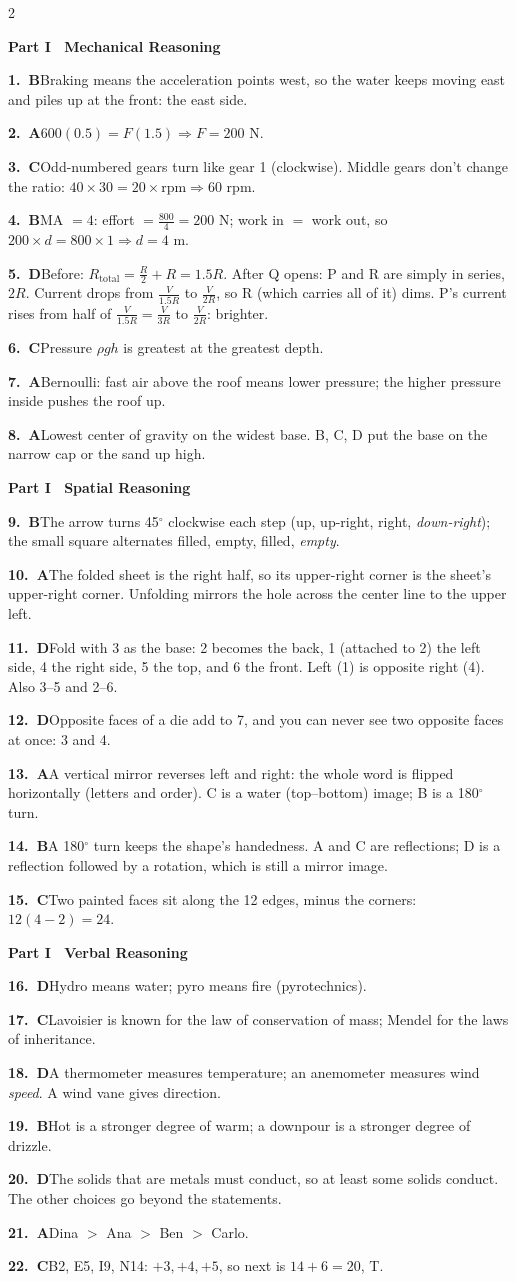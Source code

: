 \documentclass[10pt]{article}
\newcommand{\ans}[3]{\par\noindent\textbf{#1.~\textcolor{dblue}{#2}}\enspace #3}
\begin{document}
\begin{multicols}{2}
\footnotesize
\setlength{\parskip}{1.6pt}

{\sffamily\bfseries\color{dblue}Part I \textbullet\ Mechanical Reasoning}
\ans{1}{B}{Braking means the acceleration points west, so the water keeps moving east and piles up at the front: the east side.}
\ans{2}{A}{$600(0.5)=F(1.5)\Rightarrow F=200$ N.}
\ans{3}{C}{Odd-numbered gears turn like gear 1 (clockwise). Middle gears don't change the ratio: $40\times30=20\times\text{rpm}\Rightarrow60$ rpm.}
\ans{4}{B}{MA $=4$: effort $=\frac{800}4=200$ N; work in $=$ work out, so $200\times d=800\times1\Rightarrow d=4$ m.}
\ans{5}{D}{Before: $R_\text{total}=\frac R2+R=1.5R$. After Q opens: P and R are simply in series, $2R$. Current drops from $\frac V{1.5R}$ to $\frac V{2R}$, so R (which carries all of it) dims. P's current rises from half of $\frac V{1.5R}=\frac V{3R}$ to $\frac V{2R}$: brighter.}
\ans{6}{C}{Pressure $\rho gh$ is greatest at the greatest depth.}
\ans{7}{A}{Bernoulli: fast air above the roof means lower pressure; the higher pressure inside pushes the roof up.}
\ans{8}{A}{Lowest center of gravity on the widest base. B, C, D put the base on the narrow cap or the sand up high.}

{\sffamily\bfseries\color{dblue}Part I \textbullet\ Spatial Reasoning}
\ans{9}{B}{The arrow turns 45$^\circ$ clockwise each step (up, up-right, right, \emph{down-right}); the small square alternates filled, empty, filled, \emph{empty}.}
\ans{10}{A}{The folded sheet is the right half, so its upper-right corner is the sheet's upper-right corner. Unfolding mirrors the hole across the center line to the upper left.}
\ans{11}{D}{Fold with 3 as the base: 2 becomes the back, 1 (attached to 2) the left side, 4 the right side, 5 the top, and 6 the front. Left (1) is opposite right (4). Also 3--5 and 2--6.}
\ans{12}{D}{Opposite faces of a die add to 7, and you can never see two opposite faces at once: 3 and 4.}
\ans{13}{A}{A vertical mirror reverses left and right: the whole word is flipped horizontally (letters and order). C is a water (top--bottom) image; B is a 180$^\circ$ turn.}
\ans{14}{B}{A 180$^\circ$ turn keeps the shape's handedness. A and C are reflections; D is a reflection followed by a rotation, which is still a mirror image.}
\ans{15}{C}{Two painted faces sit along the 12 edges, minus the corners: $12(4-2)=24$.}

{\sffamily\bfseries\color{dblue}Part I \textbullet\ Verbal Reasoning}
\ans{16}{D}{Hydro means water; pyro means fire (pyrotechnics).}
\ans{17}{C}{Lavoisier is known for the law of conservation of mass; Mendel for the laws of inheritance.}
\ans{18}{D}{A thermometer measures temperature; an anemometer measures wind \emph{speed}. A wind vane gives direction.}
\ans{19}{B}{Hot is a stronger degree of warm; a downpour is a stronger degree of drizzle.}
\ans{20}{D}{The solids that are metals must conduct, so at least some solids conduct. The other choices go beyond the statements.}
\ans{21}{A}{Dina $>$ Ana $>$ Ben $>$ Carlo.}
\ans{22}{C}{B2, E5, I9, N14: $+3,+4,+5$, so next is $14+6=20$, T.}


\end{multicols}
\end{document}
